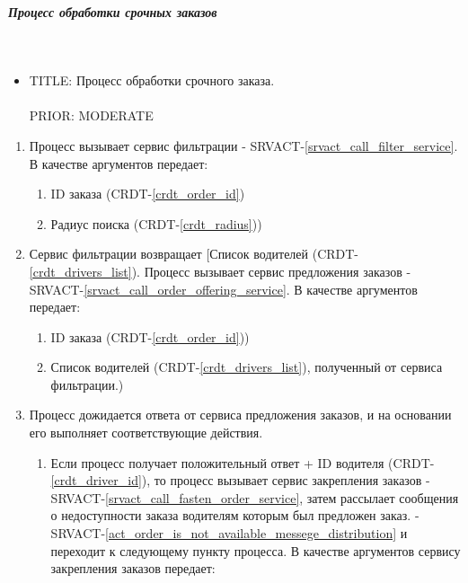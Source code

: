 \subparagraph{Процесс обработки срочных заказов} \mbox{} \\ \label{}

  \begin{itemize}

       \item {
         TITLE: Процесс обработки срочного заказа.\\
         \\
         PRIOR: MODERATE\\
       }

       \end{itemize}

  \begin{alg} \label{alg_urgent_order_processing} \mbox{}

      \begin{enumerate}

         	\item Процесс вызывает сервис фильтрации - SRVACT-\ref{srvact_call_filter_service}. В качестве аргументов передает:

         		\begin{enumerate}
         			\item ID заказа (CRDT-\ref{crdt_order_id})
         			\item Радиус поиска (CRDT-\ref{crdt_radius}))
         		\end{enumerate}

          \item Сервис фильтрации возвращает [Список водителей (CRDT-\ref{crdt_drivers_list}). Процесс вызывает сервис предложения заказов - SRVACT-\ref{srvact_call_order_offering_service}. В качестве аргументов передает:

         		\begin{enumerate}
         			\item ID заказа (CRDT-\ref{crdt_order_id}))
         			\item Список водителей (CRDT-\ref{crdt_drivers_list}), полученный от сервиса фильтрации.)
         		\end{enumerate}
        
          \item Процесс дожидается ответа от сервиса предложения заказов, и на основании его выполняет соответствующие действия.
          
          	\begin{enumerate}
         			\item Если процесс получает положительный ответ + ID водителя (CRDT-\ref{crdt_driver_id}), то процесс вызывает сервис закрепления заказов - SRVACT-\ref{srvact_call_fasten_order_service}, затем рассылает сообщения о недоступности заказа водителям которым был предложен заказ. -  SRVACT-\ref{act_order_is_not_available_messege_distribution} и переходит к следующему пункту процесса. В качестве аргументов сервису закрепления заказов передает: 


\end{enumerate}
\end{enumerate}
\end{alg}
